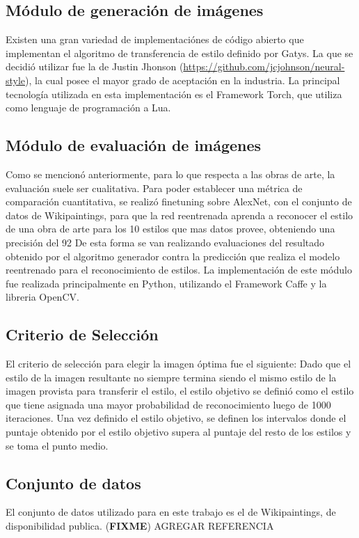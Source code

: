 \documentclass[a4paper,11pt,spanish]{book}
\newcommand*{\FIXME}[1]{{(\textbf{FIXME}) {#1}}}
\begin{document}
    \subsection{Módulo de generación de imágenes}
      Existen una gran variedad de implementaciónes de código abierto que implementan el algoritmo de transferencia de estilo definido por Gatys. 
      La que se decidió utilizar fue la de Justin Jhonson (\url{https://github.com/jcjohnson/neural-style}), la cual posee el mayor grado de aceptación en la industria.
      La principal tecnología utilizada en esta implementación es el Framework Torch, que utiliza como lenguaje de programación a Lua.
    \subsection{Módulo de evaluación de imágenes}
      Como se mencionó anteriormente, para lo que respecta a las obras de arte, la evaluación suele ser cualitativa.
      Para poder establecer una métrica de comparación cuantitativa, se realizó finetuning sobre AlexNet, con el conjunto de datos de Wikipaintings, para que la red reentrenada aprenda a reconocer
      el estilo de una obra de arte para los 10 estilos que mas datos provee, obteniendo una precisión del 92%
      De esta forma se van realizando evaluaciones del resultado obtenido por el algoritmo generador contra la predicción que realiza el modelo reentrenado para el reconocimiento de estilos.
      La implementación de este módulo fue realizada principalmente en Python, utilizando el Framework Caffe y la libreria OpenCV.
    \subsection{Criterio de Selección}
      El criterio de selección para elegir la imagen óptima fue el siguiente:
      Dado que el estilo de la imagen resultante no siempre termina siendo el mismo estilo de la imagen provista para transferir el estilo, el estilo objetivo se definió como el estilo
      que tiene asignada una mayor probabilidad de reconocimiento luego de 1000 iteraciones.
      Una vez definido el estilo objetivo, se definen los intervalos donde el puntaje obtenido por el estilo objetivo supera al puntaje del resto de los estilos y se toma el punto medio.

    \subsection{Conjunto de datos}
      El conjunto de datos utilizado para en este trabajo es el de Wikipaintings, de disponibilidad publica. \FIXME{AGREGAR REFERENCIA}
\end{document}
